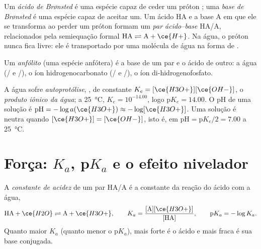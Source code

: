 \begin{definition}\label{def:b1:predominant-reaction:bronsted}
Um \emph{ácido de Brønsted} é uma espécie capaz de
ceder um próton ; uma \emph{base de Brønsted} é
uma espécie capaz de aceitar um. Um ácido HA e a base A em que ele se
transforma ao perder um próton formam um \emph{par
ácido--base} HA/A, relacionados pela semiequação
formal $\mathrm{HA} \rightleftharpoons
\mathrm{A} + \ce{H+}$. Na água, o próton nunca fica livre: ele é
transportado por uma molécula de água na forma de .
\end{definition}

\begin{definition}[Anfólito]\label{def:b1:predominant-reaction:ampholyte}
Um \emph{anfólito} (uma espécie anfótera) é a base de um
par e o ácido de outro: a água (/ e /),
o íon hidrogenocarbonato (/ e
/), o íon di-hidrogenofosfato.
\end{definition}

\begin{definition}\label{def:b1:predominant-reaction:autoprotolysis}
A água sofre \emph{autoprotólise},
, de constante $K_e = [\ce{H3O+}][\ce{OH-}]$, o
\emph{produto iônico da água}; a
\qty{25}{\celsius}, $K_e = 10^{-14.00}$, logo $\mathrm{p}K_e = 14.00$. O
pH de uma solução é $\mathrm{pH} = -\log a(\ce{H3O+}) \approx -\log[\ce{H3O+}]$.
Uma solução é neutra quando $[\ce{H3O+}] = [\ce{OH-}]$, isto é, em
$\mathrm{pH} = \mathrm{p}K_e/2 = 7.00$ a \qty{25}{\celsius}.
\end{definition}

\section{Força: \texorpdfstring{$K_a$}{Ka}, \texorpdfstring{p$K_a$}{pKa} e o efeito nivelador}

\begin{definition}\label{def:b1:predominant-reaction:acidity-constant}
A \emph{constante de acidez} de um par HA/A é
a constante da reação do ácido com a água,
\[
  \mathrm{HA} + \ce{H2O} \rightleftharpoons \mathrm{A} + \ce{H3O+}, \qquad
  K_a = \frac{[\mathrm{A}][\ce{H3O+}]}{[\mathrm{HA}]}, \qquad
  \mathrm{p}K_a = -\log K_a .
\]
Quanto maior $K_a$ (quanto menor o $\mathrm{p}K_a$), mais forte é o
ácido e mais fraca é sua base conjugada.
\end{definition}

